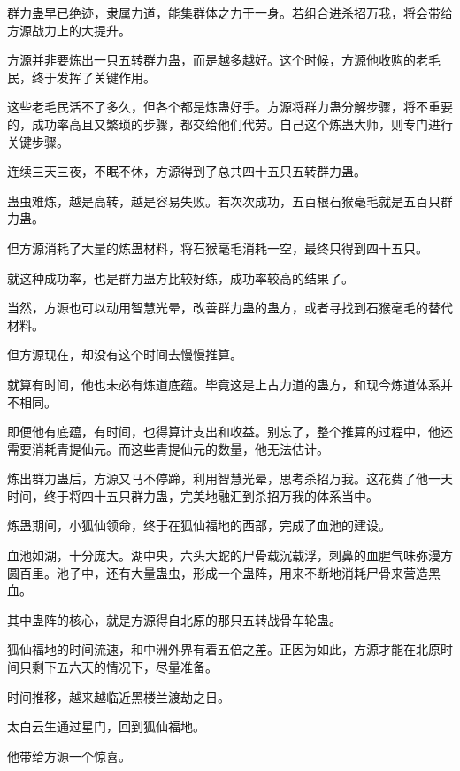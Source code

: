\begin{this_body}
群力蛊早已绝迹，隶属力道，能集群体之力于一身。若组合进杀招万我，将会带给方源战力上的大提升。

方源并非要炼出一只五转群力蛊，而是越多越好。这个时候，方源他收购的老毛民，终于发挥了关键作用。

这些老毛民活不了多久，但各个都是炼蛊好手。方源将群力蛊分解步骤，将不重要的，成功率高且又繁琐的步骤，都交给他们代劳。自己这个炼蛊大师，则专门进行关键步骤。

连续三天三夜，不眠不休，方源得到了总共四十五只五转群力蛊。

蛊虫难炼，越是高转，越是容易失败。若次次成功，五百根石猴毫毛就是五百只群力蛊。

但方源消耗了大量的炼蛊材料，将石猴毫毛消耗一空，最终只得到四十五只。

就这种成功率，也是群力蛊方比较好练，成功率较高的结果了。

当然，方源也可以动用智慧光晕，改善群力蛊的蛊方，或者寻找到石猴毫毛的替代材料。

但方源现在，却没有这个时间去慢慢推算。

就算有时间，他也未必有炼道底蕴。毕竟这是上古力道的蛊方，和现今炼道体系并不相同。

即便他有底蕴，有时间，也得算计支出和收益。别忘了，整个推算的过程中，他还需要消耗青提仙元。而这些青提仙元的数量，他无法估计。

炼出群力蛊后，方源又马不停蹄，利用智慧光晕，思考杀招万我。这花费了他一天时间，终于将四十五只群力蛊，完美地融汇到杀招万我的体系当中。

炼蛊期间，小狐仙领命，终于在狐仙福地的西部，完成了血池的建设。

血池如湖，十分庞大。湖中央，六头大蛇的尸骨载沉载浮，刺鼻的血腥气味弥漫方圆百里。池子中，还有大量蛊虫，形成一个蛊阵，用来不断地消耗尸骨来营造黑血。

其中蛊阵的核心，就是方源得自北原的那只五转战骨车轮蛊。

狐仙福地的时间流速，和中洲外界有着五倍之差。正因为如此，方源才能在北原时间只剩下五六天的情况下，尽量准备。

时间推移，越来越临近黑楼兰渡劫之日。

太白云生通过星门，回到狐仙福地。

他带给方源一个惊喜。

\end{this_body}

